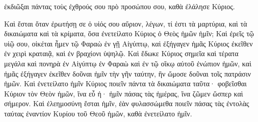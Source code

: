 {ἐκδιῶξαι πάντας τοὺς ἐχθρούς σου πρὸ προσώπου σου, καθὰ ἐλάλησε Κύριος.
\par }{\PP {}Καὶ ἔσται ὅταν ἐρωτήσῃ σε ὁ υἱός σου αὔριον, λέγων, τί ἐστι τὰ μαρτύρια, καὶ τὰ δικαιώματα καὶ τὰ κρίματα, ὅσα ἐνετείλατο Κύριος ὁ Θεὸς ἡμῶν ἡμῖν;
Καὶ ἐρεῖς τῷ υἱῷ σου, οἰκέται ἦμεν τῷ Φαραὼ ἐν γῇ Αἰγύπτῳ, καὶ ἐξήγαγεν ἡμᾶς Κύριος ἐκεῖθεν ἐν χειρὶ κραταιᾷ, καὶ ἐν βραχίονι ὑψηλῷ.
Καὶ ἔδωκε Κύριος σημεῖα καὶ τέρατα μεγάλα καὶ πονηρὰ ἐν Αἰγύπτῳ ἐν Φαραὼ καὶ ἐν τῷ οἴκῳ αὐτοῦ ἐνώπιον ἡμῶν,
καὶ ἡμᾶς ἐξήγαγεν ἐκεῖθεν δοῦναι ἡμῖν τὴν γῆν ταύτην, ἣν ὤμοσε δοῦναι τοῖς πατράσιν ἡμῶν.
Καὶ ἐνετείλατο ἡμῖν Κύριος ποιεῖν πάντα τὰ δικαιώματα ταῦτα· φοβεῖσθαι Κύριον τὸν Θεὸν ἡμῶν, ἵνα εὖ ἠ· ἡμῖν πάσας τὰς ἡμέρας, ἵνα ζῶμεν ὥσπερ καὶ σήμερον.
Καὶ ἐλεημοσύνη ἔσται ἡμῖν, ἐὰν φυλασσώμεθα ποιεῖν πάσας τὰς ἐντολὰς ταύτας ἐναντίον Κυρίου τοῦ Θεοῦ ἡμῶν, καθὰ ἐνετείλατο ἡμῖν.

}
